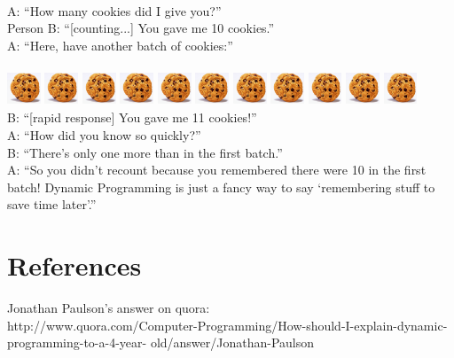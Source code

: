 \documentclass[12pt]{article}
\begin{document}
\\
A: ``How many cookies did I give you?''\\
Person B: ``[counting...] You gave me 10 cookies.''\\
A: ``Here, have another batch of cookies:''\\
\\
\includegraphics[height=10mm, width=10mm]{cookie.jpg}
\includegraphics[height=10mm, width=10mm]{cookie.jpg}
\includegraphics[height=10mm, width=10mm]{cookie.jpg}
\includegraphics[height=10mm, width=10mm]{cookie.jpg}
\includegraphics[height=10mm, width=10mm]{cookie.jpg}
\includegraphics[height=10mm, width=10mm]{cookie.jpg}
\includegraphics[height=10mm, width=10mm]{cookie.jpg}
\includegraphics[height=10mm, width=10mm]{cookie.jpg}
\includegraphics[height=10mm, width=10mm]{cookie.jpg}
\includegraphics[height=10mm, width=10mm]{cookie.jpg}
\includegraphics[height=10mm, width=10mm]{cookie.jpg}
\\
B: ``[rapid response] You gave me 11 cookies!''\\
A: ``How did you know so quickly?''\\
B: ``There's only one more than in the first batch.''\\
A: ``So you didn't recount because you remembered there were 10 in the first batch! Dynamic Programming is just a fancy way to say `remembering stuff to save time later'.''
\newpage
\section{References}
Jonathan Paulson's answer on quora:\\
http://www.quora.com/Computer-Programming/How-should-I-explain-dynamic-programming-to-a-4-year- old/answer/Jonathan-Paulson
\end{document}
